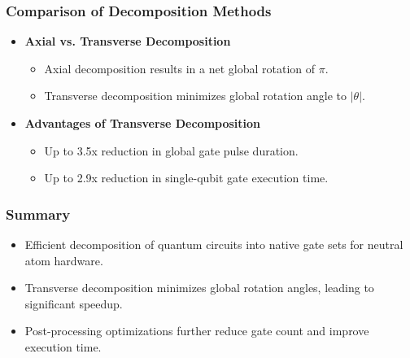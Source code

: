\documentclass[18 pt]{beamer}
\begin{document}
\begin{frame}
    \frametitle{Comparison of Decomposition Methods}
    \begin{itemize}
        \item \textbf{Axial vs. Transverse Decomposition}
        \begin{itemize}
            \item Axial decomposition results in a net global rotation of $\pi$.
            \item Transverse decomposition minimizes global rotation angle to $|\theta|$.
        \end{itemize}
        \item \textbf{Advantages of Transverse Decomposition}
        \begin{itemize}
            \item Up to 3.5x reduction in global gate pulse duration.
            \item Up to 2.9x reduction in single-qubit gate execution time.
        \end{itemize}
    \end{itemize}
\end{frame}

\begin{frame}
    \frametitle{Summary}
    \begin{itemize}
        \item Efficient decomposition of quantum circuits into native gate sets for neutral atom hardware.
        \item Transverse decomposition minimizes global rotation angles, leading to significant speedup.
        \item Post-processing optimizations further reduce gate count and improve execution time.
    \end{itemize}
\end{frame}
\end{document}
